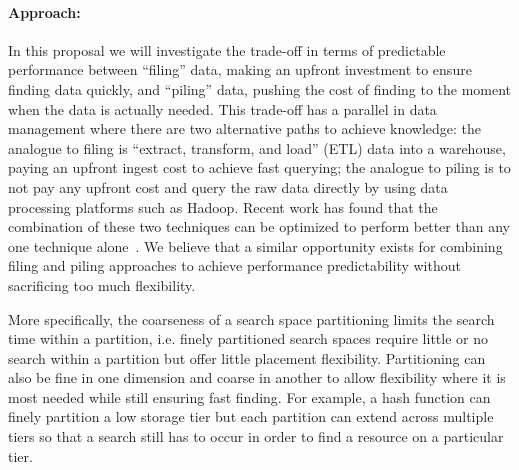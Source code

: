 \paragraph{Approach:} 
In this proposal we will investigate the trade-off in terms of predictable performance between 
``filing'' data, making an upfront investment to ensure finding data quickly, and ``piling'' 
data, pushing the cost of finding to the moment when the data is actually needed. This trade-off 
has a parallel in data management where there are two alternative paths to achieve knowledge: 
the analogue to filing is ``extract, transform, and load'' (ETL) data into a warehouse, paying 
an upfront ingest cost to achieve fast querying; the analogue to piling is to not pay any upfront 
cost and query the raw data directly by using data processing platforms such as Hadoop. Recent work 
has found that the combination of these two techniques can be optimized to perform better than 
any one technique alone~\cite{lefevre:sigmod14a}. We believe that a similar opportunity exists 
for combining filing and piling approaches to achieve performance predictability without sacrificing 
too much flexibility.

More specifically, the coarseness of a search space partitioning limits the search time within 
a partition, i.e. finely partitioned search spaces require little or no search within a partition 
but offer little placement flexibility. Partitioning can also be fine in one dimension and coarse 
in another to allow flexibility where it is most needed while still ensuring fast finding. For 
example, a hash function can finely partition a low storage tier but each partition can extend 
across multiple tiers so that a search still has to occur in order to find a resource on a particular 
tier.  


